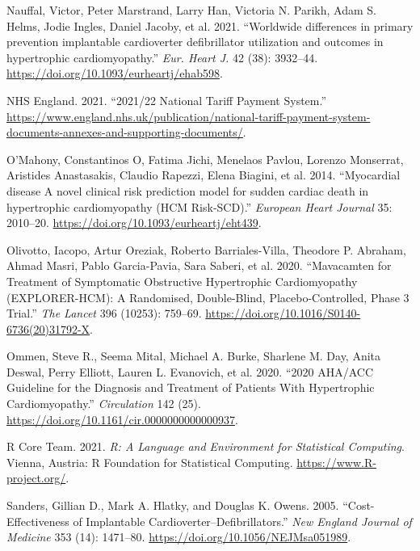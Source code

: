 \documentclass[
]{article}
\newlength{\cslhangindent}
\newlength{\cslentryspacingunit} %
\newenvironment{CSLReferences}[2] %
 {%
  \setlength{\parindent}{0pt}
  \ifodd #1
  \let\oldpar\par
  \def\par{\hangindent=\cslhangindent\oldpar}
  \fi
  \setlength{\parskip}{#2\cslentryspacingunit}
 }%
 {}
\begin{document}
\begin{CSLReferences}{1}{0}
\leavevmode{}%
Nauffal, Victor, Peter Marstrand, Larry Han, Victoria N. Parikh, Adam S.
Helms, Jodie Ingles, Daniel Jacoby, et al. 2021. {``{Worldwide
differences in primary prevention implantable cardioverter defibrillator
utilization and outcomes in hypertrophic cardiomyopathy}.''} \emph{Eur.
Heart J.} 42 (38): 3932--44.
\url{https://doi.org/10.1093/eurheartj/ehab598}.

\leavevmode{}%
NHS England. 2021. {``{2021/22 National Tariff Payment System}.''}
\url{https://www.england.nhs.uk/publication/national-tariff-payment-system-documents-annexes-and-supporting-documents/}.

\leavevmode{}%
O'Mahony, Constantinos O, Fatima Jichi, Menelaos Pavlou, Lorenzo
Monserrat, Aristides Anastasakis, Claudio Rapezzi, Elena Biagini, et al.
2014. {``{Myocardial disease A novel clinical risk prediction model for
sudden cardiac death in hypertrophic cardiomyopathy (HCM Risk-SCD)}.''}
\emph{European Heart Journal} 35: 2010--20.
\url{https://doi.org/10.1093/eurheartj/eht439}.

\leavevmode{}%
Olivotto, Iacopo, Artur Oreziak, Roberto Barriales-Villa, Theodore P.
Abraham, Ahmad Masri, Pablo Garcia-Pavia, Sara Saberi, et al. 2020.
{``Mavacamten for Treatment of Symptomatic Obstructive Hypertrophic
Cardiomyopathy (EXPLORER-HCM): A Randomised, Double-Blind,
Placebo-Controlled, Phase 3 Trial.''} \emph{The Lancet} 396 (10253):
759--69. \url{https://doi.org/10.1016/S0140-6736(20)31792-X}.

\leavevmode{}%
Ommen, Steve R., Seema Mital, Michael A. Burke, Sharlene M. Day, Anita
Deswal, Perry Elliott, Lauren L. Evanovich, et al. 2020. {``{2020
AHA/ACC Guideline for the Diagnosis and Treatment of Patients With
Hypertrophic Cardiomyopathy}.''} \emph{Circulation} 142 (25).
\url{https://doi.org/10.1161/cir.0000000000000937}.

\leavevmode{}%
R Core Team. 2021. \emph{R: A Language and Environment for Statistical
Computing}. Vienna, Austria: R Foundation for Statistical Computing.
\url{https://www.R-project.org/}.

\leavevmode{}%
Sanders, Gillian D., Mark A. Hlatky, and Douglas K. Owens. 2005.
{``Cost-Effectiveness of Implantable Cardioverter--Defibrillators.''}
\emph{New England Journal of Medicine} 353 (14): 1471--80.
\url{https://doi.org/10.1056/NEJMsa051989}.


\end{CSLReferences}
\end{document}
